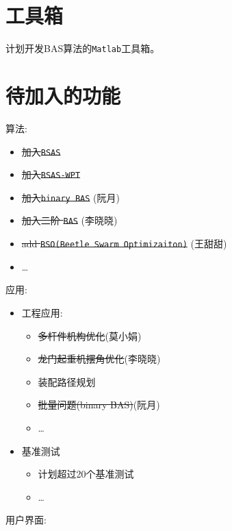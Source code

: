 \documentclass[]{ctexbook}
\providecommand{\tightlist}{%
  \setlength{\itemsep}{0pt}\setlength{\parskip}{0pt}}
\begin{document}
\section{工具箱}

计划开发BAS算法的\texttt{Matlab}工具箱。

\section{待加入的功能}

算法:

\begin{itemize}
\tightlist
\item
  \sout{加入\texttt{BSAS}}
\item
  \sout{加入\texttt{BSAS-WPT}}
\item
  \sout{加入\texttt{binary\ BAS}} (阮月)
\item
  \sout{加入二阶 \texttt{BAS}} (李晓晓)
\item
  \sout{add \texttt{BSO(Beetle\ Swarm\ Optimizaiton)}} (王甜甜)
\item
  \ldots{}
\end{itemize}

应用:

\begin{itemize}
\tightlist
\item
  工程应用:

  \begin{itemize}
  \tightlist
  \item
    \sout{多杆件机构优化}(莫小娟)
  \item
    \sout{龙门起重机摆角优化}(李晓晓)
  \item
    装配路径规划
  \item
    \sout{批量问题(binary BAS)}(阮月)
  \item
    \ldots{}
  \end{itemize}
\item
  基准测试

  \begin{itemize}
  \tightlist
  \item
    计划超过20个基准测试
  \item
    \ldots{}
  \end{itemize}
\end{itemize}

用户界面:
\end{document}
